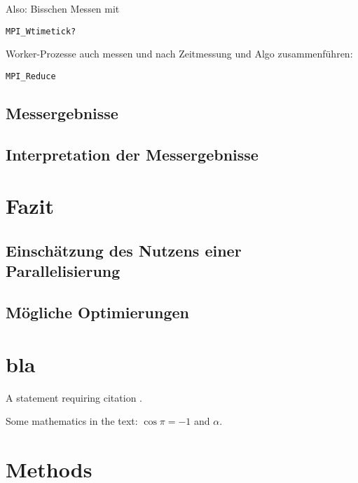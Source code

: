 \documentclass[
10pt, %
a4paper, %
oneside, %
headinclude,footinclude, %
BCOR5mm, %
]{scrartcl}
\begin{document}
Also: Bisschen Messen mit 

\begin{lstlisting}
MPI_Wtimetick?
\end{lstlisting}

Worker-Prozesse auch messen und nach Zeitmessung und Algo zusammenführen:

\begin{lstlisting}
MPI_Reduce
\end{lstlisting}


\subsection{Messergebnisse}

\subsection{Interpretation der Messergebnisse}

\section{Fazit}
\subsection{Einschätzung des Nutzens einer Parallelisierung}
\subsection{Mögliche Optimierungen}

\section{bla}

A statement requiring citation \cite{Figueredo:2009dg}.

\lipsum[1-3] %

Some mathematics in the text: $\cos\pi=-1$ and $\alpha$.
 

\section{Methods}

\lipsum[5] %
\end{document}
